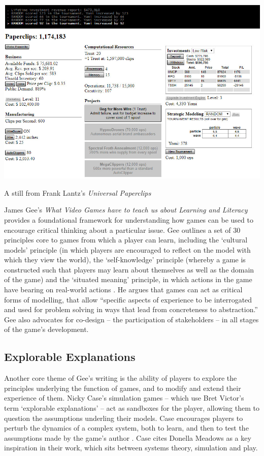 \documentclass[nofonts,nols,justified,nobib]{tufte-book}
\begin{document}
\begin{marginfigure}
\includegraphics[width=\textwidth]{img/1/universal-paperclips-progress.jpg}
\caption{A still from Frank Lantz's \emph{Universal Paperclips} \cite{lantz_universal_2017}}
\end{marginfigure}

James Gee's \emph{What Video Games have to teach us about Learning and Literacy} provides a foundational framework for understanding how games can be used to encourage critical thinking about a particular issue. Gee outlines a set of 30 principles core to games from which a player can learn, including the `cultural models' principle (in which players are encouraged to reflect on the model with which they view the world), the `self-knowledge' principle (whereby a game is constructed such that players may learn about themselves as well as the domain of the game) and the `situated meaning' principle, in which actions in the game have bearing on real-world actions \cite{gee_what_2004}. He argues that games can act as critical forms of modelling, that allow ``specific aspects of experience to be interrogated and used for problem solving in ways that lead from concreteness to abstraction.'' Gee also advocates for co-design -- the participation of stakeholders -- in all stages of the game's development.

\subsection*{Explorable Explanations}
Another core theme of Gee's writing is the ability of players to explore the principles underlying the function of games, and to modify and extend their experience of them. Nicky Case's simulation games -- which use Bret Victor's term `explorable explanations' -- act as sandboxes for the player, allowing them to question the assumptions underling their models. Case encourages players to perturb the dynamics of a complex system, both to learn, and then to test the assumptions made by the game's author \cite{case_how_2016}. Case cites Donella Meadows as a key inspiration in their work, which sits between systems theory, simulation and play.
\end{document}
